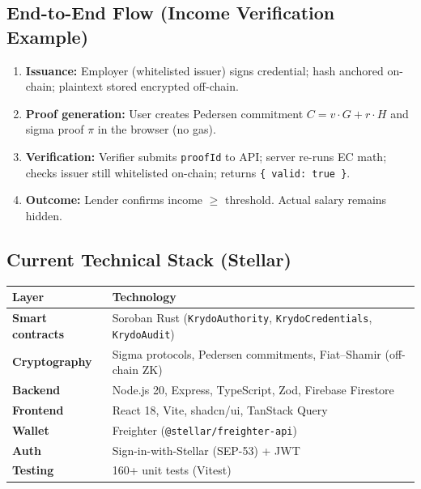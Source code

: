 \documentclass[11pt,a4paper]{article}
\newcommand{\stellar}{\textsf{Stellar}}
\newcommand{\soroban}{\textsf{Soroban}}
\begin{document}
\subsection{End-to-End Flow (Income Verification Example)}

\begin{enumerate}
  \item \textbf{Issuance:} Employer (whitelisted issuer) signs credential; hash anchored on-chain; plaintext stored encrypted off-chain.
  \item \textbf{Proof generation:} User creates Pedersen commitment $C = v \cdot G + r \cdot H$ and sigma proof $\pi$ in the browser (no gas).
  \item \textbf{Verification:} Verifier submits \texttt{proofId} to API; server re-runs EC math; checks issuer still whitelisted on-chain; returns \texttt{\{ valid: true \}}.
  \item \textbf{Outcome:} Lender confirms income $\geq$ threshold. Actual salary remains hidden.
\end{enumerate}

\subsection{Current Technical Stack (\stellar{})}

\begin{table}[H]
  \centering
  \renewcommand{\arraystretch}{1.2}
  \begin{tabularx}{\textwidth}{@{}>{\bfseries}p{3.2cm} X@{}}
    \toprule
    Layer & Technology \\
    \midrule
    Smart contracts & \soroban{} Rust (\texttt{KrydoAuthority}, \texttt{KrydoCredentials}, \texttt{KrydoAudit}) \\
    Cryptography & Sigma protocols, Pedersen commitments, Fiat--Shamir (off-chain ZK) \\
    Backend & Node.js 20, Express, TypeScript, Zod, Firebase Firestore \\
    Frontend & React 18, Vite, shadcn/ui, TanStack Query \\
    Wallet & Freighter (\texttt{@stellar/freighter-api}) \\
    Auth & Sign-in-with-Stellar (SEP-53) + JWT \\
    Testing & 160+ unit tests (Vitest) \\
    \bottomrule
  \end{tabularx}
\end{table}
\end{document}

